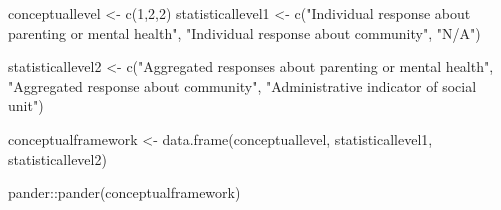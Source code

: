\documentclass[
  letterpaper,
  DIV=11,
  numbers=noendperiod]{scrreprt}
\newenvironment{Shaded}{\begin{snugshade}}{\end{snugshade}}
\newcommand{\DecValTok}[1]{\textcolor[rgb]{0.68,0.00,0.00}{#1}}
\newcommand{\FunctionTok}[1]{\textcolor[rgb]{0.28,0.35,0.67}{#1}}
\newcommand{\NormalTok}[1]{\textcolor[rgb]{0.00,0.23,0.31}{#1}}
\newcommand{\OtherTok}[1]{\textcolor[rgb]{0.00,0.23,0.31}{#1}}
\newcommand{\SpecialCharTok}[1]{\textcolor[rgb]{0.37,0.37,0.37}{#1}}
\newcommand{\StringTok}[1]{\textcolor[rgb]{0.13,0.47,0.30}{#1}}
\begin{document}
\begin{Shaded}
\begin{Highlighting}[]
\NormalTok{conceptuallevel }\OtherTok{\textless{}{-}} \FunctionTok{c}\NormalTok{(}\DecValTok{1}\NormalTok{,}\DecValTok{2}\NormalTok{,}\DecValTok{2}\NormalTok{)}
\NormalTok{statisticallevel1 }\OtherTok{\textless{}{-}} \FunctionTok{c}\NormalTok{(}\StringTok{"Individual response about parenting or mental health"}\NormalTok{,}
                       \StringTok{"Individual response about community"}\NormalTok{,}
                       \StringTok{"N/A"}\NormalTok{)}

\NormalTok{statisticallevel2 }\OtherTok{\textless{}{-}} \FunctionTok{c}\NormalTok{(}\StringTok{"Aggregated responses about parenting or mental health"}\NormalTok{,}
                       \StringTok{"Aggregated response about community"}\NormalTok{,}
                       \StringTok{"Administrative indicator of social unit"}\NormalTok{)}

\NormalTok{conceptualframework }\OtherTok{\textless{}{-}} \FunctionTok{data.frame}\NormalTok{(conceptuallevel,}
\NormalTok{                                  statisticallevel1,}
\NormalTok{                                  statisticallevel2)}

\NormalTok{pander}\SpecialCharTok{::}\FunctionTok{pander}\NormalTok{(conceptualframework)}
\end{Highlighting}
\end{Shaded}
\end{document}

